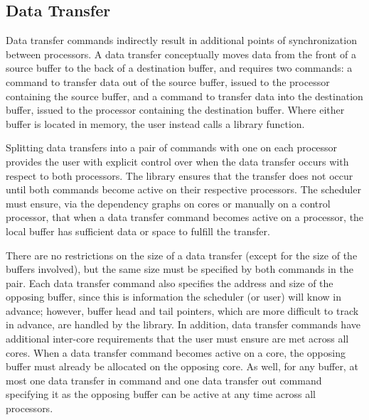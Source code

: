 
\subsection{Data Transfer}

Data transfer commands indirectly result in additional points of
synchronization between processors. A data transfer conceptually moves
data from the front of a source buffer to the back of a destination
buffer, and requires two commands: a command to transfer data out of
the source buffer, issued to the processor containing the source
buffer, and a command to transfer data into the destination buffer,
issued to the processor containing the destination buffer. Where
either buffer is located in memory, the user instead calls a library
function.

Splitting data transfers into a pair of commands with one on each
processor provides the user with explicit control over when the data
transfer occurs with respect to both processors. The library ensures
that the transfer does not occur until both commands become active on
their respective processors. The scheduler must ensure, via the
dependency graphs on cores or manually on a control processor, that
when a data transfer command becomes active on a processor, the local
buffer has sufficient data or space to fulfill the transfer.


There are no restrictions on the size of a data transfer (except for
the size of the buffers involved), but the same size must be specified
by both commands in the pair. Each data transfer command also
specifies the address and size of the opposing buffer, since this is
information the scheduler (or user) will know in advance; however,
buffer head and tail pointers, which are more difficult to track in
advance, are handled by the library. In addition, data transfer
commands have additional inter-core requirements that the user must
ensure are met across all cores. When a data transfer command becomes
active on a core, the opposing buffer must already be allocated on the
opposing core. As well, for any buffer, at most one data transfer in
command and one data transfer out command specifying it as the
opposing buffer can be active at any time across all processors.


